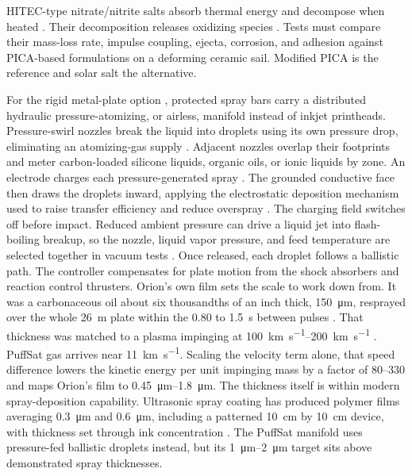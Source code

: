 \documentclass{article}
\begin{document}
HITEC-type nitrate/nitrite salts absorb thermal energy and decompose when heated \cite{hitec_solar_salt}. Their decomposition releases oxidizing species \cite{nitrate_salt_decomposition}. Tests must compare their mass-loss rate, impulse coupling, ejecta, corrosion, and adhesion against PICA-based formulations on a deforming ceramic sail. Modified PICA is the reference and solar salt the alternative.

For the rigid metal-plate option \cite{projorion}, protected spray bars carry a distributed hydraulic pressure-atomizing, or airless, manifold instead of inkjet printheads.
Pressure-swirl nozzles break the liquid into droplets using its own pressure drop, eliminating an atomizing-gas supply \cite{lefebvre2017_atomization}.
Adjacent nozzles overlap their footprints and meter carbon-loaded silicone liquids, organic oils, or ionic liquids by zone.
An electrode charges each pressure-generated spray \cite{marchant1985_hydraulic_charge}.
The grounded conductive face then draws the droplets inward, applying the electrostatic deposition mechanism used to raise transfer efficiency and reduce overspray \cite{law2001_electrostatic_spray}.
The charging field switches off before impact.
Reduced ambient pressure can drive a liquid jet into flash-boiling breakup, so the nozzle, liquid vapor pressure, and feed temperature are selected together in vacuum tests \cite{alghamdi2019_flash_boiling}.
Once released, each droplet follows a ballistic path.
The controller compensates for plate motion from the shock absorbers and reaction control thrusters.
Orion's own film sets the scale to work down from.
It was a carbonaceous oil about six thousandths of an inch thick, \SI{150}{\micro\meter}, resprayed over the whole \SI{26}{\meter} plate within the 0.80 to \SI{1.5}{\second} between pulses \cite{ga5009_vol3}.
That thickness was matched to a plasma impinging at \SIrange{100}{200}{\kilo\meter\per\second} \cite{projorion}.
PuffSat gas arrives near \SI{11}{\kilo\meter\per\second}.
Scaling the velocity term alone, that speed difference lowers the kinetic energy per unit impinging mass by a factor of 80--330 and maps Orion's film to \SIrange{0.45}{1.8}{\micro\meter}.
The thickness itself is within modern spray-deposition capability.
Ultrasonic spray coating has produced polymer films averaging \SI{0.3}{\micro\meter} and \SI{0.6}{\micro\meter}, including a patterned \SI{10}{\centi\meter} by \SI{10}{\centi\meter} device, with thickness set through ink concentration \cite{liu2017_ultrasonic_spray_film}.
The PuffSat manifold uses pressure-fed ballistic droplets instead, but its \SIrange{1}{2}{\micro\meter} target sits above demonstrated spray thicknesses.
\end{document}
